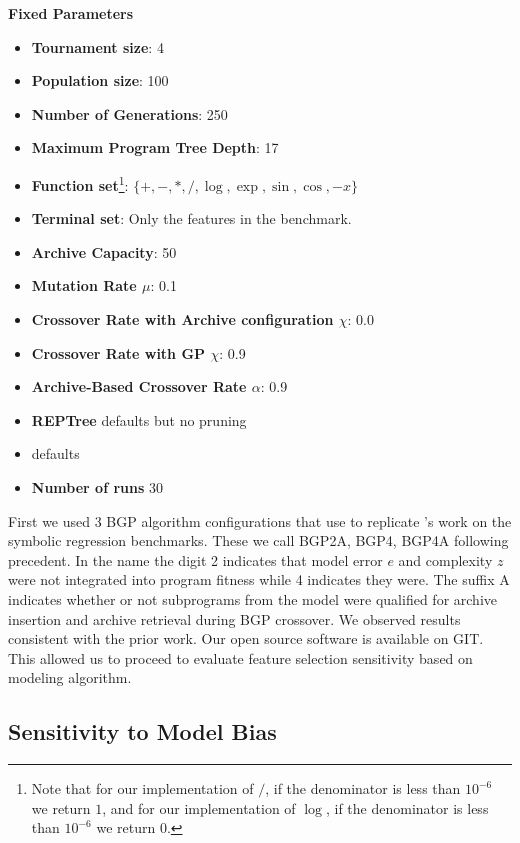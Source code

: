 \textbf{Fixed Parameters}\label{appendix:fixed_parameters}
\begin{itemize}
\item \textbf{Tournament size}: 4
\item \textbf{Population size}: 100
\item \textbf{Number of Generations}: 250
\item \textbf{Maximum Program Tree Depth}: 17
\item \textbf{Function set}\footnote{Note that for our implementation of $/$, if the denominator is less than $10^{-6}$ we return $1$, and for our implementation of $\log$, if the denominator is less than $10^{-6}$ we return $0$.}: $\{ +, -, *, /, \log, \exp, \sin, \cos, -x \}$
\item \textbf{Terminal set}: Only the features in the benchmark.
\item \textbf{Archive Capacity}: 50
\item \textbf{Mutation Rate $\mu$}: 0.1
\item \textbf{Crossover Rate with Archive configuration $\chi$}: 0.0
\item \textbf{Crossover Rate with GP $\chi$}: 0.9
\item \textbf{Archive-Based Crossover Rate $\alpha$}: 0.9
\item \textbf{REPTree}  defaults but no pruning
\item \textbf{\SCIKIT} defaults
\item \textbf{Number of runs} 30
\end{itemize}

First we used 3 BGP algorithm configurations that use \REPTREE to replicate \cite{krawiecGecco2014}'s work on the symbolic regression benchmarks. These we call BGP2A, BGP4, BGP4A following precedent. In the name the digit 2 indicates that model error $e$ and complexity $z$ were not integrated into program fitness while 4 indicates they were.   The suffix A indicates whether or not subprograms from the model were qualified for archive insertion and archive retrieval during BGP crossover. We observed results consistent with the prior work. Our open source software is available on GIT.
This allowed us to proceed to evaluate feature selection sensitivity based on modeling algorithm.

\subsection{Sensitivity to Model Bias}\label{sect:ftr-select}

